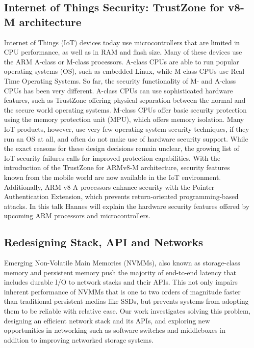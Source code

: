 \subsection{Internet of Things Security: TrustZone for v8-M architecture}

Internet of Things (IoT) devices today use microcontrollers that are limited
in CPU performance, as well as in RAM and flash size. Many of these devices
use the ARM A-class or M-class processors. A-class CPUs are able to run
popular operating systems (OS), such as embedded Linux, while M-class CPUs use
Real-Time Operating Systems. So far, the security functionality of M- and
A-class CPUs has been very different.  A-class CPUs can use sophisticated
hardware features, such as TrustZone offering physical separation between the
normal and the secure world operating systems. M-class CPUs offer basic
security protection using the memory protection unit (MPU), which offers
memory isolation.  Many IoT products, however, use very few operating system
security techniques, if they run an OS at all, and often do not make use of
hardware security support. While the exact reasons for these design decisions
remain unclear, the growing list of IoT security failures calls for improved
protection capabilities.  With the introduction of the TrustZone for ARMv8-M
architecture, security features known from the mobile world are now available
in the IoT environment. Additionally, ARM v8-A processors  enhance security
with the Pointer Authentication Extension, which prevents return-oriented
programming-based attacks.  In this talk Hannes will explain the hardware
security features offered by upcoming ARM processors and microcontrollers.

\subsection{Redesigning Stack, API and Networks}

Emerging Non-Volatile Main Memories (NVMMs), also known as storage-class
memory and persistent memory  push the majority of end-to-end latency that
includes durable I/O to network stacks and their APIs.  This not only impairs
inherent performance of NVMMs that is one to two orders of magnitude faster
than traditional persistent medias like SSDs, but prevents systems from
adopting them to be reliable with relative ease.  Our work investigates
solving this problem, designing an efficient network stack and its APIs, and
exploring new opportunities in networking such as software switches and
middleboxes in addition to improving networked storage systems.

